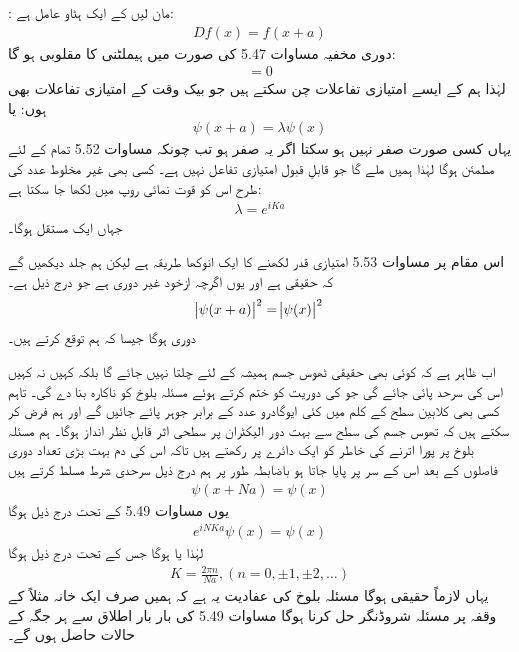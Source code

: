 : مان لیں کے  ایک ہٹاو عامل ہے:
\begin{align}
	Df(x) = f(x+a)
\end{align}
دوری مخفیہ مساوات \num{5.47} کی صورت میں  ہیملٹنی کا  مقلوبی  ہو گا:
\begin{align}
	[D, H] = 0
\end{align}
لہٰذا ہم  کے ایسے امتیازی تفاعلات چن سکتے ہیں جو بیک وقت  کے امتیازی تفاعلات بھی ہوں: یا
\begin{align}
	\psi(x+a) = \lambda\psi(x)
\end{align}
یہاں  کسی صورت صفر نہیں ہو سکتا اگر یہ صفر ہو تب چونکہ مساوات \num{5.52} تمام  کے لئے مطمئن ہوگا لہٰذا ہمیں  ملے گا جو قابلِ قبول امتیازی تفاعل نہیں ہے۔ کسی بھی غیر مخلوط عدد کی طرح اس کو قوت نمائی روپ میں لکھا جا سکتا ہے: 
\begin{align}
	\lambda = e^{iKa}
\end{align}
جہاں  ایک مستقل ہوگا۔

اس مقام پر مساوات \num{5.53} امتیازی قدر  لکھنے کا ایک انوکھا طریقہ ہے لیکن ہم جلد دیکھیں گے کہ  حقیقی ہے اور یوں اگرچہ  ازخود غیر دوری ہے جو درج ذیل ہے۔
\begin{align}
	\abs{\psi(x+a)}^{2} = \abs{\psi(x)}^{2}
\end{align}
دوری ہوگا جیسا کہ ہم توقع کرتے ہیں۔
 
اب ظاہر ہے کہ کوئی بھی حقیقی ٹھوس جسم ہمیشہ کے لئے چلتا نہیں جائے گا بلکہ کہیں نہ کہیں اس کی سرحد پائی جائے گی جو  کی دوریت کو ختم کرتے ہوئے مسئلہ بلوخ کو ناکارہ بنا دے گی۔ تاہم کسی بھی کلابین سطح کے  کلم میں کئی ایوگادرو عدد کے برابر جوہر پائے جائیں گے اور ہم فرض کر سکتے ہیں کہ تھوس جسم کی سطح سے بہت دور الیکٹران پر سطحی اثر قابلِ نظر انداز ہوگا۔ ہم مسئلہ بلوخ پر پورا اترنے کی خاطر  کو ایک دائرے پر رکھتے ہیں تاکہ اس کی دم بہت بڑی تعداد  دوری فاصلوں کے بعد اس کے سر پر پایا جاتا ہو باضابطہ طور پر ہم درج ذیل سرحدی شرط مسلط کرتے ہیں   
\begin{align}
	\psi(x+Na) = \psi(x)
\end{align}
یوں مساوات \num{5.49} کے تحت درج ذیل ہوگا
\begin{align*}
	e^{iNKa}\psi(x) = \psi(x)
\end{align*}
لہٰذا  یا  ہوگا جس کے تحت درج ذیل ہوگا 
\begin{align}
	K = \frac{2\pi n}{Na}, (n = 0, \pm1, \pm2, \dots)
\end{align}
یہاں  لازماً حقیقی ہوگا مسئلہ بلوخ کی عفادیت یہ ہے کہ ہمیں صرف ایک خانہ مثلاً  کے وقفہ پر مسئلہ شروڈنگر حل کرنا ہوگا مساوات \num{5.49} کی بار بار اطلاق سے ہر جگہ کے حالات  حاصل ہوں گے۔

